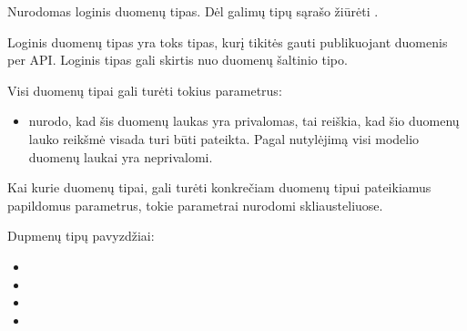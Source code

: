 \documentclass[letterpaper,10pt,lithuanian]{sphinxmanual}
\begin{document}
\begin{fulllineitems}
\label{\detokenize{dimensijos:property.type}}
\pysigstartsignatures
\pysigline
{}
\pysigstopsignatures
\sphinxAtStartPar
Nurodomas loginis duomenų tipas. Dėl galimų tipų sąrašo žiūrėti
{\hyperref[\detokenize{tipai:duomenu-tipai}]{}}.

\sphinxAtStartPar
Loginis duomenų tipas yra toks tipas, kurį tikitės gauti publikuojant
duomenis per API. Loginis tipas gali skirtis nuo duomenų šaltinio tipo.

\sphinxAtStartPar
Visi duomenų tipai gali turėti tokius parametrus:
\begin{itemize}
\item {} 
\sphinxAtStartPar
{} \sphinxhyphen{} nurodo, kad šis duomenų laukas yra privalomas, tai reiškia,
kad šio duomenų lauko reikšmė visada turi būti pateikta. Pagal nutylėjimą
visi modelio duomenų laukai yra neprivalomi.

\end{itemize}

\sphinxAtStartPar
Kai kurie duomenų tipai, gali turėti konkrečiam duomenų tipui pateikiamus
papildomus parametrus, tokie parametrai nurodomi skliausteliuose.

\sphinxAtStartPar
Dupmenų tipų pavyzdžiai:
\begin{itemize}
\item {} 
\sphinxAtStartPar
{}

\item {} 
\sphinxAtStartPar
{}

\item {} 
\sphinxAtStartPar
{}

\item {} 
\sphinxAtStartPar
{}

\end{itemize}

\end{fulllineitems}

\end{document}
